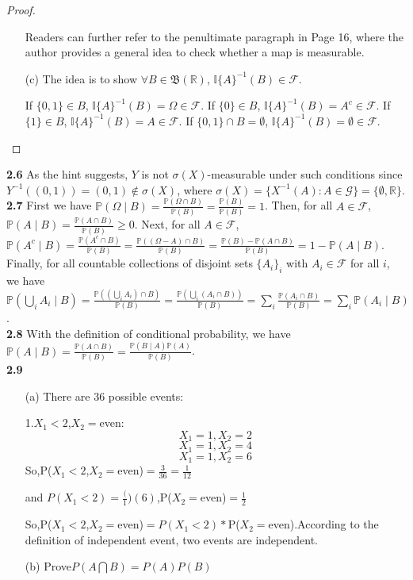 \begin{proof}
\begin{enumerate}
    Readers can further refer to the penultimate paragraph in Page 16, where the author provides a general idea to check whether a map is measurable.

    \item[(c)] The idea is to show $\forall B \in \mathfrak{B}(\mathbb{R})$, $\mathbb{I}\{A\}^{-1}(B) \in \mathcal{F}$.

    If $\{0,1\} \in B$, $\mathbb{I}\{A\}^{-1}(B)=\Omega \in \mathcal{F}$. If $\{0\} \in B$, $\mathbb{I}\{A\}^{-1}(B)=A^c \in \mathcal{F}$. If $\{1\} \in B$, $\mathbb{I}\{A\}^{-1}(B)=A \in \mathcal{F}$. If $\{0,1\} \cap B = \emptyset$, $\mathbb{I}\{A\}^{-1}(B)=\emptyset \in \mathcal{F}$.
\end{enumerate}
\end{proof}

\noindent\textbf{2.6}
As the hint suggests, $Y$ is not $\sigma(X)$-measurable under such conditions since $Y^{-1}((0, 1))=(0, 1) \notin \sigma(X)$, where $\sigma(X) = \{{X}^{-1}(A): A \in \mathcal{G}\} = \{\emptyset, \mathbb{R}\}$.\\

\noindent\textbf{2.7}
First we have $\mathbb{P}(\Omega \mid B) = \frac{\mathbb{P}(\Omega \cap B)}{\mathbb{P}(B)} = \frac{\mathbb{P}(B)}{\mathbb{P}(B)} = 1$. Then, for all $A \in \mathcal{F}$, $\mathbb{P}(A \mid B) = \frac{\mathbb{P}(A \cap B)}{\mathbb{P}(B)} \geq 0$. Next, for all $A \in \mathcal{F}$, $\mathbb{P}(A^c \mid B) = \frac{\mathbb{P}(A^c \cap B)}{\mathbb{P}(B)} = \frac{\mathbb{P}((\Omega - A) \cap B)}{\mathbb{P}(B)} = \frac{\mathbb{P}(B) - \mathbb{P}(A \cap B)}{\mathbb{P}(B)} = 1 - \mathbb{P}(A \mid B)$. Finally, for all countable collections of disjoint sets $\{A_i\}_i$ with $A_i \in \mathcal{F}$ for all $i$, we have $\mathbb{P}\left(\bigcup_{i} A_{i} \mid B\right) = \frac{\mathbb{P}((\bigcup_{i} A_{i}) \cap B)}{\mathbb{P}(B)} = \frac{\mathbb{P}(\bigcup_{i} (A_{i} \cap B))}{\mathbb{P}(B)} = \sum_{i} \frac{\mathbb{P}(A_{i} \cap B)}{\mathbb{P}(B)} = \sum_{i} \mathbb{P}(A_i \mid B)$. \\

\noindent\textbf{2.8}
With the definition of conditional probability, we have $\mathbb{P}(A \mid B) = \frac{\mathbb{P}(A \cap B)}{\mathbb{P}(B)} = \frac{\mathbb{P}(B \mid A) \mathbb{P}(A)}{\mathbb{P}(B)}$. \\

\noindent\textbf{2.9}

\begin{enumerate}
    \item[(a)]There are 36 possible events:

1.$X_1 < 2$,$X_2=$even:
$$X_1=1,X_2=2$$
$$X_1=1,X_2=4$$
$$X_1=1,X_2=6$$
So,P($X_1 < 2$,$X_2=$even)$=\frac{3}{36} = \frac{1}{12}$

and $P(X_1 < 2)=\frac(1)(6)$,P($X_2=$even)$=\frac{1}{2} $

So,P($X_1 < 2$,$X_2=$even)$=P(X_1 < 2)*$P($X_2=$even).According to the definition of independent event, two events are independent.

\item[(b)]Prove$P(A\bigcap B)=P(A)P(B)$
\end{enumerate}

